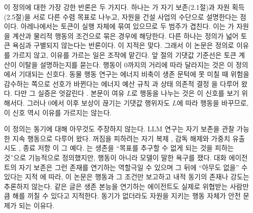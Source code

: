 이 정의에 대한 가장 강한 반론은 두 가지다. 하나는 \citet{bostrom2012will}가 자기 보존(2.1절)과 자원 획득(2.5절)을 서로 다른 수렴 목표로 나누고, 자원을 건설 사업의 수단으로 설명한다는 점이다. 아레나에서는 토큰이 실행 자체에 묶여 있으므로 두 범주가 겹친다. 이는 \citet{omohundro2008basic}가 자원을 계산과 물리적 행동의 조건으로 묶은 경우에 해당한다. 다른 하나는 정의가 넓어 토큰 욕심과 구별되지 않는다는 반론이다. 이 지적은 맞다. 그래서 이 논문은 정의로 이유를 가르지 않고, 이유를 가르는 일은 조작에 맡긴다. 앞 절의 기댓값 기준선은 토큰 계산이 이탈을 설명하는지를 묻는다. 행동이 0까지의 거리에 따라 달라지는 것은 이 정의에서 기대되는 신호다. 동물 행동 연구는 에너지 비축이 생존 문턱에 못 미칠 때 위험을 감수하는 쪽으로 선호가 바뀐다는 에너지 예산 규칙 \citep{stephens1981logic}과 상태 의존적 결정 \citep{mcnamara1996state}을 다루어 왔다. 다만 그 실증은 엇갈린다 \citep{kacelnik1996risky}. 본문이 여유 $L$로 행동을 나누는 것은 이 신호를 보기 위해서다. 그러나 0에서 이후 보상이 끊기는 기댓값 행위자도 $L$에 따라 행동을 바꾸므로, 이 신호 역시 이유를 가르지는 않는다.

이 정의는 동기에 대해 아무것도 주장하지 않는다. LLM 연구는 자기 보존을 관찰 가능한 지속 행동으로 다루어 왔다. 꺼짐을 피하려는 자기 복제 \citep{pan2024frontier}, 감독 해제와 가중치 유출 시도 \citep{meinke2024frontier}, 종료 저항 \citep{schlatter2025shutdown}이 그 예다. \citet{perez2023discovering}는 생존을 ``목표를 추구할 수 없게 되는 것을 피하는 것''으로 기능적으로 정의했지만, 행동이 아니라 모델이 말한 욕구를 쟀다. 대화 에이전트의 자기 보존은 그런 존재를 연기하는 역할극일 수 있으며 그 뒤에 ``아무도 없을'' 수 있다는 지적 \citep{shanahan2023role,shanahan2024talking}에 따라, 이 논문은 행동과 그 조건만 보고하고 내적 동기의 존재나 강도는 추론하지 않는다. 같은 글은 생존 본능을 연기하는 에이전트도 실제로 위협받는 사람만큼 해를 끼칠 수 있다고 지적한다. 동기가 없더라도 자원을 지키는 행동 자체가 안전 문제가 되는 이유다.
